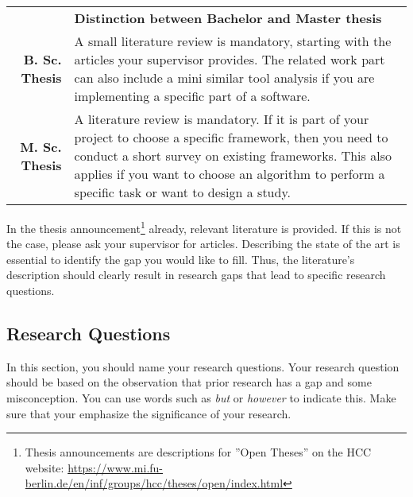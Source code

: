 \begin{table}[htb]
\small
\colorbox{bamacolor}{
\centering
\begin{tabularx}{\textwidth}{@{} r Y @{}}
	&
	\textbf{Distinction between Bachelor and Master thesis}\vspace{2mm}\\
    \textbf{B. Sc. Thesis} &
    A small literature review is mandatory, starting with the articles your supervisor provides. The related work part can also include a mini similar tool analysis if you are implementing a specific part of a software. \vspace{2mm}\\
	\textbf{M. Sc. Thesis} &
	A literature review is mandatory. If it is part of your project to choose a specific framework, then you need to conduct a short survey on existing frameworks. This also applies if you want to choose an algorithm to perform a specific task or want to design a study. \vspace{2mm}\\

\end{tabularx}
}
\end{table}

In the thesis announcement\footnote{Thesis announcements are descriptions for ''Open Theses'' on the HCC website: \url{https://www.mi.fu-berlin.de/en/inf/groups/hcc/theses/open/index.html}} already, relevant literature is provided. If this is not the case, please ask your supervisor for articles. Describing the state of the art is essential to identify the gap you would like to fill. Thus, the literature's description should clearly result in research gaps that lead to specific research questions. 


\subsection{Research Questions}
\label{subsec:question}
In this section, you should name your research questions. Your research question should be based on the observation that prior research has a gap and some misconception. You can use words such as \emph{but} or \emph{however} to indicate this. Make sure that your emphasize the significance of your research. 